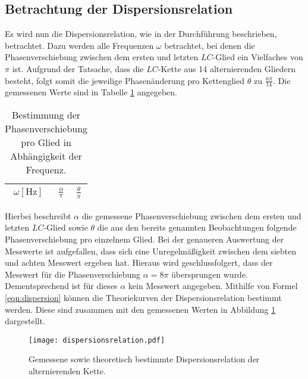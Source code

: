 \subsection{Betrachtung der Dispersionsrelation}
\label{sec:dis}
Es wird nun die Dispersionsrelation, wie in der Durchführung beschrieben, betrachtet.
Dazu werden alle Frequenzen $\omega$ betrachtet, bei denen die Phasenverschiebung zwischen dem ersten und letzten $LC$-Glied ein Vielfaches von $\pi$ ist.
Aufgrund der Tatsache, dass die $LC$-Kette aus 14 alternierenden Gliedern besteht, folgt somit die jeweilige Phasenänderung pro Kettenglied $\theta$ zu $\frac{n \pi}{14}$.
Die gemessenen Werte sind in Tabelle \ref{tab:dispersion} angegeben.
\begin{table}
  \centering
  \caption{Bestimmung der Phasenverschiebung pro Glied in Abhängigkeit der Frequenz.}
  \label{tab:dispersion}
  \begin{tabular}{c c c}
    \toprule
    {$\omega [\si{\hertz}]$} & {$\frac{\alpha}{\pi} $} & {$\frac{\theta}{\pi} $}\\
    \midrule
    
    \bottomrule
  \end{tabular}
\end{table}
Hierbei beschreibt $\alpha$ die gemessene Phasenverschiebung zwischen dem ersten und letzten $LC$-Glied sowie $\theta$ die aus den bereits genannten Beobachtungen folgende Phasenverschiebung pro einzelnem Glied.
Bei der genaueren Auswertung der Messwerte ist aufgefallen, dass sich eine Unregelmäßigkeit zwischen dem siebten und achten Messwert ergeben hat.
Hieraus wird geschlussfolgert, dass der Messwert für die Phasenverschiebung $\alpha = 8 \pi$ übersprungen wurde.
Dementsprechend ist für dieses $\alpha$ kein Messwert angegeben.
Mithilfe von Formel \eqref{eqn:dispersion} können die Theoriekurven der Dispersionsrelation bestimmt werden.
Diese sind zusammen mit den gemessenen Werten in Abbildung \ref{fig:dispersion_fertig} dargestellt.
\begin{figure}[H]
  \centering
  \texttt{[image: dispersionsrelation.pdf]}
  \caption{Gemessene sowie theoretisch bestimmte Dispersionsrelation der alternierenden Kette.}
  \label{fig:dispersion_fertig}
\end{figure}

